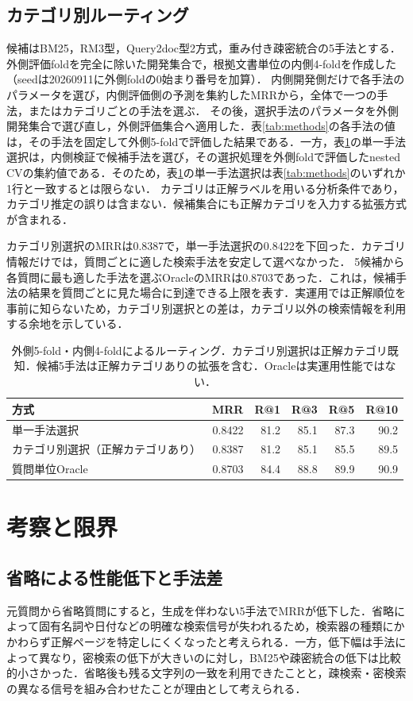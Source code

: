 \documentclass[twocolumn,a4paper,10pt]{ltjsarticle}
\begin{document}
\subsection{カテゴリ別ルーティング}
候補はBM25，RM3型，Query2doc型2方式，重み付き疎密統合の5手法とする．外側評価foldを完全に除いた開発集合で，根拠文書単位の内側4-foldを作成した（seedは20260911に外側foldの0始まり番号を加算）．
内側開発側だけで各手法のパラメータを選び，内側評価側の予測を集約したMRRから，全体で一つの手法，またはカテゴリごとの手法を選ぶ．
その後，選択手法のパラメータを外側開発集合で選び直し，外側評価集合へ適用した．表\ref{tab:methods}の各手法の値は，その手法を固定して外側5-foldで評価した結果である．一方，表\ref{tab:routing}の単一手法選択は，内側検証で候補手法を選び，その選択処理を外側foldで評価したnested CVの集約値である．そのため，表\ref{tab:routing}の単一手法選択は表\ref{tab:methods}のいずれか1行と一致するとは限らない．
カテゴリは正解ラベルを用いる分析条件であり，カテゴリ推定の誤りは含まない．候補集合にも正解カテゴリを入力する拡張方式が含まれる．

カテゴリ別選択のMRRは0.8387で，単一手法選択の0.8422を下回った．カテゴリ情報だけでは，質問ごとに適した検索手法を安定して選べなかった．
5候補から各質問に最も適した手法を選ぶOracleのMRRは0.8703であった．これは，候補手法の結果を質問ごとに見た場合に到達できる上限を表す．実運用では正解順位を事前に知らないため，カテゴリ別選択との差は，カテゴリ以外の検索情報を利用する余地を示している．
\begin{table}[tb]
\centering\small
\caption{外側5-fold・内側4-foldによるルーティング．カテゴリ別選択は正解カテゴリ既知．候補5手法は正解カテゴリありの拡張を含む．Oracleは実運用性能ではない．}\label{tab:routing}
\begin{tabular}{lrrrrr}
\toprule
方式 & MRR & R@1 & R@3 & R@5 & R@10 \\
\midrule
単一手法選択 & 0.8422 & 81.2 & 85.1 & 87.3 & 90.2 \\
カテゴリ別選択（正解カテゴリあり） & 0.8387 & 81.2 & 85.1 & 85.5 & 89.5 \\
質問単位Oracle & 0.8703 & 84.4 & 88.8 & 89.9 & 90.9 \\
\bottomrule
\end{tabular}
\end{table}
\section{考察と限界}
\subsection{省略による性能低下と手法差}
元質問から省略質問にすると，生成を伴わない5手法でMRRが低下した．省略によって固有名詞や日付などの明確な検索信号が失われるため，検索器の種類にかかわらず正解ページを特定しにくくなったと考えられる．一方，低下幅は手法によって異なり，密検索の低下が大きいのに対し，BM25や疎密統合の低下は比較的小さかった．省略後も残る文字列の一致を利用できたことと，疎検索・密検索の異なる信号を組み合わせたことが理由として考えられる．
\end{document}
